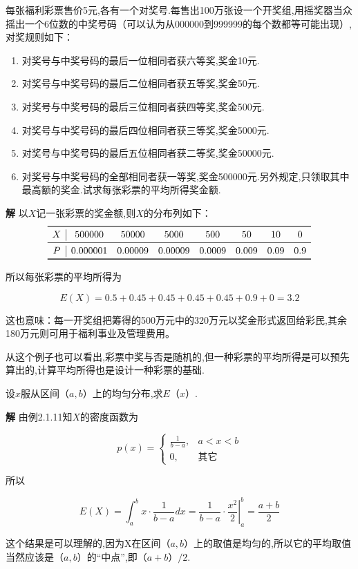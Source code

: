 \begin{example}
	每张福利彩票售价5元,各有一个对奖号.每售出100万张设一个开奖组,用摇奖器当众摇出一个6位数的中奖号码（可以认为从000000到999999的每个数都等可能出现）,对奖规则如下：
	\begin{enumerate}
		\item 对奖号与中奖号码的最后一位相同者获六等奖,奖金10元.
		\item 对奖号与中奖号码的最后二位相同者获五等奖,奖金50元.
		\item 对奖号与中奖号码的最后三位相同者获四等奖,奖金500元.
		\item 对奖号与中奖号码的最后四位相同者获三等奖,奖金5000元.
		\item 对奖号与中奖号码的最后五位相同者获二等奖,奖金50000元.
		\item 对奖号与中奖号码的全部相同者获一等奖,奖金500000元.另外规定,只领取其中最高额的奖金.试求每张彩票的平均所得奖金额.
	\end{enumerate}
	
	\textbf{解} 以$ X $记一张彩票的奖金额,则$ X $的分布列如下：
	\[
	\begin{array}{c|ccccccc}
	\toprule
	X     & 500000 & 50000 & 5000  & 500   & 50    & 10    & 0 \\\midrule
	P     & 0.000001 & 0.00009 & 0.00009 & 0.0009 & 0.009 & 0.09  & 0.9 \\\bottomrule
	\end{array}
	\]
	
	
	所以每张彩票的平均所得为
	
	\[ 
	E(X)=0.5+0.45+0.45+0.45+0.45+0.9+0=3.2
	\]
	
	这也意味：每一开奖组把筹得的500万元中的320万元以奖金形式返回给彩民,其余180万元则可用于福利事业及管理费用。
	
	从这个例子也可以看出,彩票中奖与否是随机的,但一种彩票的平均所得是可以预先算出的,计算平均所得也是设计一种彩票的基础.
	
\end{example}

\begin{example}
	设$ x $服从区间$ （a,b） $上的均匀分布,求$ E（x） $.
	
	\textbf{解} 由例2.1.11知$ X $的密度函数为
	
	\[ 
	p(x)=\left\{\begin{array}{ll}
	{\frac{1}{b-a}, }&{a<x<b} \\ {0,}&{\text{其它}}
	\end{array}\right.
	\]
	
	所以
	
	\[ 
	E(X)=\int_{a}^{b} x \cdot \frac{1}{b-a} d x=\frac{1}{b-a} \cdot\left.\frac{x^{2}}{2}\right|_{a} ^{b}=\frac{a+b}{2}
	\]
	
	这个结果是可以理解的,因为X在区间$ （a,b） $上的取值是均匀的,所以它的平均取值当然应该是$ （a,b） $的“中点”,即$ （a+b）/2 $.
	
	
\end{example}

